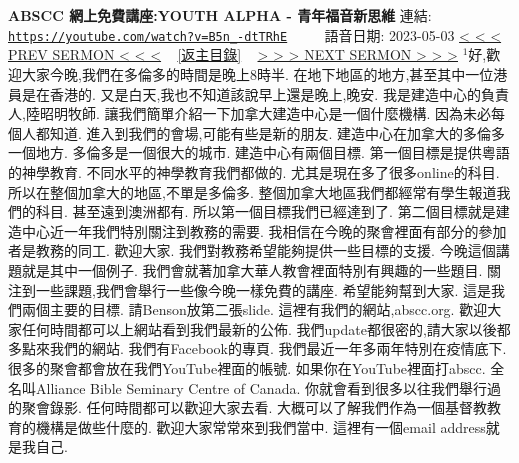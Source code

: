 \documentclass{book}
\begin{document}
\section{}
\label{sec:B5n__dtTRhE}
\textbf{ABSCC 網上免費講座:YOUTH ALPHA - 青年福音新思維}
\newline
\newline
連結: \href{https://youtube.com/watch?v=B5n_-dtTRhE}{\texttt{https://youtube.com/watch?v=B5n\_-dtTRhE}} ~~~~ 語音日期: 2023-05-03
\newline
\newline
\hyperref[sec:3o4omcoTUB4]{\small{< < < PREV SERMON < < <}}
~
\hyperref[sec:index]{\small{[返主目錄]}}
~
\hyperref[sec:6]{\small{> > > NEXT SERMON > > >}}
\newline
\newline
$^{1}$好,歡迎大家今晚,我們在多倫多的時間是晚上8時半.
在地下地區的地方,甚至其中一位港員是在香港的.
又是白天,我也不知道該說早上還是晚上,晚安.
我是建造中心的負責人,陸昭明牧師.
讓我們簡單介紹一下加拿大建造中心是一個什麼機構.
因為未必每個人都知道.
進入到我們的會場,可能有些是新的朋友.
建造中心在加拿大的多倫多一個地方.
多倫多是一個很大的城市.
建造中心有兩個目標.
第一個目標是提供粵語的神學教育.
不同水平的神學教育我們都做的.
尤其是現在多了很多online的科目.
所以在整個加拿大的地區,不單是多倫多.
整個加拿大地區我們都經常有學生報道我們的科目.
甚至遠到澳洲都有.
所以第一個目標我們已經達到了.
第二個目標就是建造中心近一年我們特別關注到教務的需要.
我相信在今晚的聚會裡面有部分的參加者是教務的同工.
歡迎大家.
我們對教務希望能夠提供一些目標的支援.
今晚這個講題就是其中一個例子.
我們會就著加拿大華人教會裡面特別有興趣的一些題目.
關注到一些課題,我們會舉行一些像今晚一樣免費的講座.
希望能夠幫到大家.
這是我們兩個主要的目標.
請Benson放第二張slide.
這裡有我們的網站,abscc.org.
歡迎大家任何時間都可以上網站看到我們最新的公佈.
我們update都很密的,請大家以後都多點來我們的網站.
我們有Facebook的專頁.
我們最近一年多兩年特別在疫情底下.
很多的聚會都會放在我們YouTube裡面的帳號.
如果你在YouTube裡面打abscc.
全名叫Alliance Bible Seminary Centre of Canada.
你就會看到很多以往我們舉行過的聚會錄影.
任何時間都可以歡迎大家去看.
大概可以了解我們作為一個基督教教育的機構是做些什麼的.
歡迎大家常常來到我們當中.
這裡有一個email address就是我自己.
\end{document}
